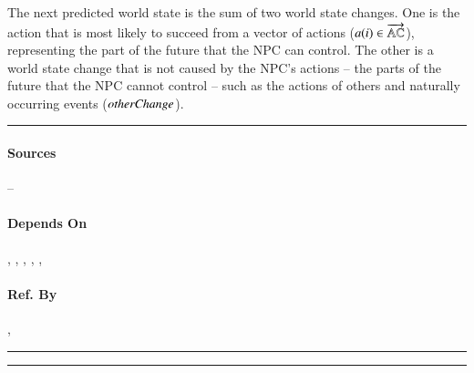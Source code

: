 The next predicted world state is the sum of two world state changes. One is
the action that is most likely to succeed from a vector of actions ($a(i) \in
\overrightarrow{\mathbb{AC}}$), representing the part of the future that the
NPC can control. The other is a world state change that is not caused by the
NPC's actions -- the parts of the future that the NPC cannot control -- such as
the actions of others and naturally occurring events ($\mathit{otherChange}$). \\\hrule

\paragraph{Sources} --

\paragraph{Depends On} , , 
, , , 

\paragraph{Ref. By} , 
\\\hrule\vspace{0.5mm}\hrule

~\newline

